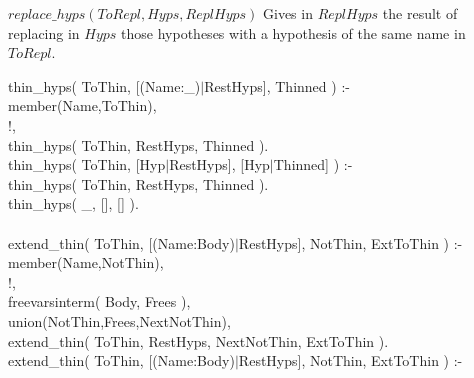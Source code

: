 \documentclass[11pt]{report}
\begin{document}
 $replace\_hyps( ToRepl, Hyps, ReplHyps )$ Gives in $ReplHyps$ the result
 of replacing in $Hyps$ those hypotheses with a hypothesis of the same
 name in $ToRepl$.
 
\begin{sf}\begin{tabbing}
thin\_\hspace{0.1em}hyps( ToThin, [(Name:\_\hspace{0.1em})$\mid$RestHyps], Thinned ) :-\\[-0.15ex]
\hspace{2em}member(Name,ToThin),\\[-0.15ex]
\hspace{2em}!,\\[-0.15ex]
\hspace{2em}thin\_\hspace{0.1em}hyps( ToThin, RestHyps, Thinned ).\\[-0.15ex]
thin\_\hspace{0.1em}hyps( ToThin, [Hyp$\mid$RestHyps], [Hyp$\mid$Thinned] ) :-\\[-0.15ex]
\hspace{2em}thin\_\hspace{0.1em}hyps( ToThin, RestHyps, Thinned ).\\[-0.15ex]
thin\_\hspace{0.1em}hyps( \_\hspace{0.1em}, [], [] ).\\[-0.7ex]
\\[-0.15ex]
extend\_\hspace{0.1em}thin( ToThin, [(Name:Body)$\mid$RestHyps], NotThin, ExtToThin ) :-\\[-0.15ex]
\hspace{2em}member(Name,NotThin),\\[-0.15ex]
\hspace{2em}!,\\[-0.15ex]
\hspace{2em}freevarsinterm( Body, Frees ),\\[-0.15ex]
\hspace{2em}union(NotThin,Frees,NextNotThin),\\[-0.15ex]
\hspace{2em}extend\_\hspace{0.1em}thin( ToThin, RestHyps, NextNotThin, ExtToThin ).\\[-0.15ex]
extend\_\hspace{0.1em}thin( ToThin, [(Name:Body)$\mid$RestHyps], NotThin, ExtToThin ) :-\\[-0.15ex]

\end{tabbing}
\end{sf}
\end{document}
